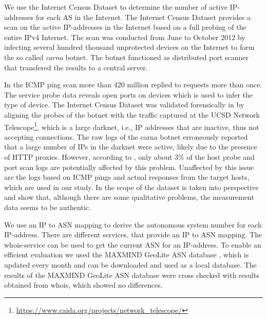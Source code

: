 We use the Internet Census Dataset \cite{carna2013} to determine the number of active IP-addresses for each AS in the Internet.
The Internet Census Dataset provides a scan on the active IP-addresses in the Internet based on a full probing of the entire IPv4 Internet.
The scan was conducted from June to October 2012 by infecting several hundred thousand unprotected devices on the Internet to form the so called \emph{carna} botnet.
The botnet functioned as distributed port scanner that transfered the results to a central server.

In the ICMP ping scan more than 420 million replied to requests more than once.
The service probe data reveals open ports on devices which is used to infer the type of device.
The Internet Census Dataset was validated forensically in \cite{dainotticaida} by aligning the probes of the botnet with the traffic captured at the UCSD Network Telescope\footnote{\url{https://www.caida.org/projects/network_telescope/}}, which is a large darknet, i.e., IP addresses that are inactive, thus not accepting connections.
The raw logs of the carna botnet erroneously reported that a large number of IPs in the darknet were active, likely due to the presence of HTTP proxies.
However, according to \cite{dainotticaida}, only about 3\% of the host probe and port scan logs are potentially affected by this problem.
Unaffected by this issue are the logs based on ICMP pings and actual responses from the target hosts, which are used in our study.
In \cite{krenc2014internet} the scope of the dataset is taken into perspective and show that, although there are some qualitative problems, the measurement data seems to be authentic.

We use an IP to ASN mapping to derive the autonomous system number for each IP-address. There are different services, that provide an IP to ASN mapping.
The whois-service can be used to get the current ASN for an IP-address.
To enable an efficient evaluation we used the MAXMIND GeoLite ASN database \cite{geo_ip}, which is updated every month and can be downloaded and used as a local database.
The results of the MAXMIND GeoLite ASN database were cross checked with results obtained from whois, which showed no differences.

